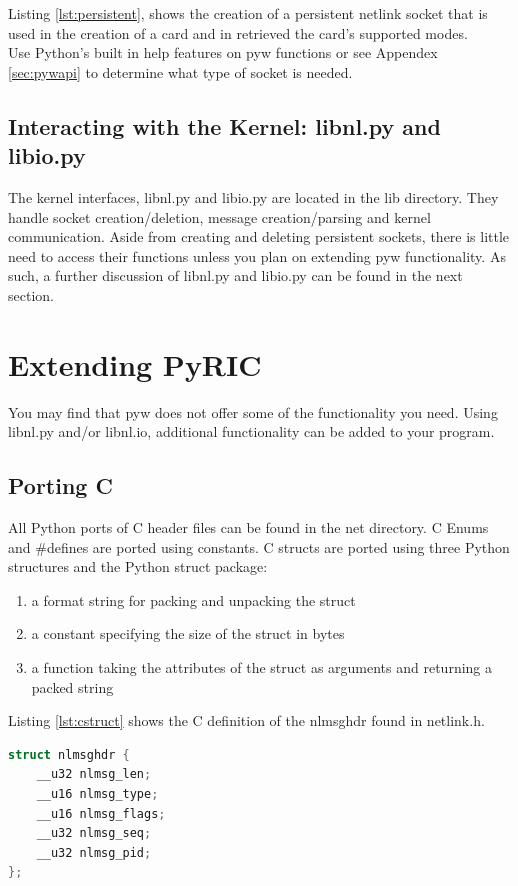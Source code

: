 \documentclass[11pt]{article}
\begin{document}
Listing \ref{lst:persistent}, shows the creation of a persistent netlink socket 
that is used in the creation of a card and in retrieved the card's supported
modes. \\

Use Python's built in help features on pyw functions or see Appendex \ref{sec:pywapi} 
to determine what type of 
socket is needed.

\subsection{Interacting with the Kernel: libnl.py and libio.py}
The kernel interfaces, libnl.py and libio.py are located in the lib directory.
They handle socket creation/deletion, message creation/parsing and kernel 
communication. Aside from creating and deleting persistent sockets, there is 
little need to access their functions unless you plan on extending pyw 
functionality. As such, a further discussion of libnl.py and libio.py can be 
found in the next section.   

\section{Extending PyRIC}\label{sec:extending}
You may find that pyw does not offer some of the functionality you need. Using
libnl.py and/or libnl.io, additional functionality can be added to your program. 

\subsection{Porting C}
All Python ports of C header files can be found in the net directory. C Enums 
and \#defines are ported using constants. C structs are ported using three 
Python structures and the Python struct package:
\begin{enumerate}
\item a format string for packing and unpacking the struct
\item a constant specifying the size of the struct in bytes
\item a function taking the attributes of the struct as arguments and returning
a packed string
\end{enumerate}
Listing \ref{lst:cstruct} shows the C definition of the nlmsghdr found in netlink.h.

\begin{lstlisting}[caption={C Struct nlmsghdr},
                   label={lst:cstruct},
                   language=C]
struct nlmsghdr {
    __u32 nlmsg_len;
    __u16 nlmsg_type;
    __u16 nlmsg_flags;
    __u32 nlmsg_seq;
    __u32 nlmsg_pid;
};
\end{lstlisting}
\end{document}
